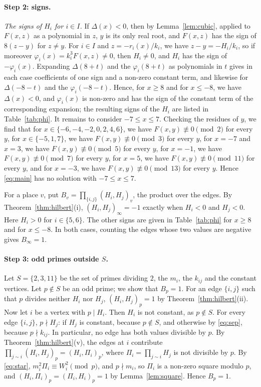\documentclass[11pt]{article}
\begin{document}
\paragraph{Step 2: signs.} \emph{The signs of $H_i$ for $i\in I$.} If $\Delta(x)<0$, then by Lemma~\ref{lem:cubic}, applied to $F(x,z)$ as a polynomial in $z$, $y$ is its only real root, and $F(x,z)$ has the sign of $8(z-y)$ for $z\neq y$. For $i\in I$ and $z=-r_i(x)/k_i$, we have $z-y=-H_i/k_i$, so if moreover $\varphi_i(x)=k_i^3F(x,z)\neq0$, then $H_i\neq0$, and $H_i$ has the sign of $-\varphi_i(x)$. Expanding $\Delta(8+t)$ and the $\varphi_i(8+t)$ as polynomials in $t$ gives in each case coefficients of one sign and a non-zero constant term, and likewise for $\Delta(-8-t)$ and the $\varphi_i(-8-t)$. Hence, for $x\geq8$ and for $x\leq-8$, we have $\Delta(x)<0$, and $\varphi_i(x)$ is non-zero and has the sign of the constant term of the corresponding expansion; the resulting signs of the $H_i$ are listed in Table~\ref{tab:phi}. It remains to consider $-7\leq x\leq7$. Checking the residues of $y$, we find that for $x\in\{-6,\allowbreak -4,\allowbreak -2,\allowbreak 0,\allowbreak 2,\allowbreak 4,\allowbreak 6\}$, we have $F(x,y)\not\equiv0\pmod{2}$ for every $y$, for $x\in\{-5,\allowbreak 1,\allowbreak 7\}$, we have $F(x,y)\not\equiv0\pmod{3}$ for every $y$, for $x=-7$ and $x=3$, we have $F(x,y)\not\equiv0\pmod{5}$ for every $y$, for $x=-1$, we have $F(x,y)\not\equiv0\pmod{7}$ for every $y$, for $x=5$, we have $F(x,y)\not\equiv0\pmod{11}$ for every $y$, and for $x=-3$, we have $F(x,y)\not\equiv0\pmod{13}$ for every $y$. Hence \eqref{eq:main} has no solution with $-7\leq x\leq7$.

For a place $v$, put $B_v=\prod_{\{i,j\}}(H_i,H_j)_v$, the product over the edges. By Theorem~\ref{thm:hilbert}(i), $(H_i,H_j)_\infty=-1$ exactly when $H_i<0$ and $H_j<0$. Here $H_i>0$ for $i\in\{5,\allowbreak 6\}$. The other signs are given in Table~\ref{tab:phi} for $x\geq8$ and for $x\leq-8$. In both cases, counting the edges whose two values are negative gives $B_\infty=1$.

\paragraph{Step 3: odd primes outside $S$.} Let $S=\{2,3,11\}$ be the set of primes dividing $2$, the $m_{i}$, the $k_{ij}$ and the constant vertices. Let $p\notin S$ be an odd prime; we show that $B_p=1$. For an edge $\{i,j\}$ such that $p$ divides neither $H_i$ nor $H_j$, $(H_i,H_j)_p=1$ by Theorem~\ref{thm:hilbert}(ii). Now let $i$ be a vertex with $p\mid H_i$. Then $H_i$ is not constant, as $p\notin S$. For every edge $\{i,j\}$, $p\nmid H_j$: if $H_j$ is constant, because $p\notin S$, and otherwise by \eqref{eq:sep}, because $p\nmid k_{ij}$. In particular, no edge has both values divisible by $p$. By Theorem~\ref{thm:hilbert}(v), the edges at $i$ contribute $\prod_{j\sim i}(H_i,H_j)_p=(H_i,\Pi_i)_p$, where $\Pi_i=\prod_{j\sim i}H_j$ is not divisible by $p$. By \eqref{eq:star}, $m_i^2\Pi_i\equiv W_i^2\pmod p$, and $p\nmid m_i$, so $\Pi_i$ is a non-zero square modulo $p$, and $(H_i,\Pi_i)_p=(\Pi_i,H_i)_p=1$ by Lemma~\ref{lem:square}. Hence $B_p=1$.
\end{document}
